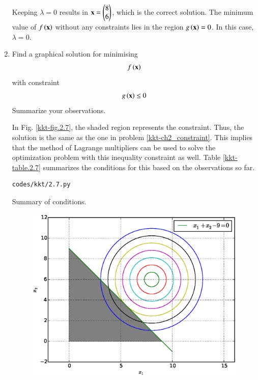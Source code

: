 \begin{enumerate}[label=\thesubsection.\arabic*,ref=\thesubsection.\theenumi]
\solution Keeping $\lambda = 0$ results in $\mathbf{x}=\begin{pmatrix} 8\\ 6\end{pmatrix}$, which is the correct solution.  The minimum value of $f\left(\mathbf{x}\right)$ without any constraints lies in the region $g\left(\mathbf{x}\right) = 0$.  In this case, $\lambda = 0$.  
%
%
\item
\label{kkt-ch2_constraint_border}
Find a graphical solution for minimising
\begin{align}
f\left(\mathbf{x}\right)
\end{align}
with constraint
\begin{align}
g\left(\mathbf{x}\right) \leq 0
\end{align}
Summarize your observations.

%
\solution In Fig. \ref{kkt-fig.2.7}, the shaded region represents the constraint.  Thus, the solution is the same as the one in problem \ref{kkt-ch2_constraint}. This implies that the method of
Lagrange multipliers can be used to solve the optimization problem with this inequality constraint as well.  Table \ref{kkt-table.2.7} summarizes the conditions for this based on the observations so far.
\begin{lstlisting}
codes/kkt/2.7.py
\end{lstlisting}
\begin{table}[!h]
\centering

	\caption{Summary of conditions.} 
\label{kkt-table.2.7}
\end{table}
%
\begin{figure}[!ht]
\centering
\includegraphics[width=\columnwidth]{./figs/kkt/2.7.eps}

\end{figure}
\end{enumerate}
